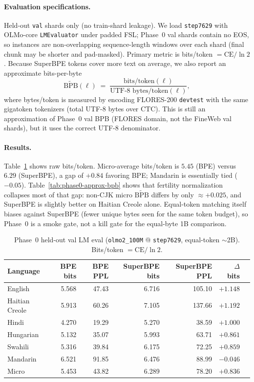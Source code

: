 \documentclass[11pt,a4paper]{article}
\newcommand{\CTC}{\mathrm{CTC}}
\begin{document}
\paragraph{Evaluation specifications.}
Held-out \texttt{val} shards only (no train-shard leakage).
We load \texttt{step7629} with OLMo-core \texttt{LMEvaluator} under padded FSL; Phase~0 val shards contain no EOS, so instances are non-overlapping sequence-length windows over each shard (final chunk may be shorter and pad-masked).
Primary metric is bits/token $=\mathrm{CE}/\ln 2$.
Because SuperBPE tokens cover more text on average, we also report an approximate bits-per-byte
\begin{equation}
  \widetilde{\mathrm{BPB}}(\ell)
  \;=\;
  \frac{\text{bits/token}(\ell)}{\text{UTF-8 bytes/token}(\ell)},
\end{equation}
where bytes/token is measured by encoding FLORES-200 \texttt{devtest} with the same gigatoken tokenizers (total UTF-8 bytes over $\CTC$).
This is still an approximation of Phase~0 val BPB (FLORES domain, not the FineWeb val shards), but it uses the correct UTF-8 denominator.

\paragraph{Results.}
Table~\ref{tab:phase0-bits} shows raw bits/token.
Micro-average bits/token is $5.45$ (BPE) versus $6.29$ (SuperBPE), a gap of $+0.84$ favoring BPE; Mandarin is essentially tied ($-0.05$).
Table~\ref{tab:phase0-approx-bpb} shows that fertility normalization collapses most of that gap: non-CJK micro $\widetilde{\mathrm{BPB}}$ differs by only $\approx{+}0.025$, and SuperBPE is slightly better on Haitian Creole alone.
Equal-token matching itself biases against SuperBPE (fewer unique bytes seen for the same token budget), so Phase~0 is a smoke gate, not a kill gate for the equal-byte 1B comparison.

\begin{table}[t]
\centering
\caption{Phase~0 held-out val LM eval (\texttt{olmo2\_100M} @ \texttt{step7629}, equal-token $\sim$2B). Bits/token $=\mathrm{CE}/\ln 2$.}
\label{tab:phase0-bits}
\small
\begin{tabular}{@{}lrrrrrr@{}}
\toprule
Language & BPE bits & BPE PPL & SuperBPE bits & SuperBPE PPL & $\Delta$ bits \\
\midrule
English        & 5.568 & 47.43 & 6.716 & 105.10 & $+1.148$ \\
Haitian Creole & 5.913 & 60.26 & 7.105 & 137.66 & $+1.192$ \\
Hindi          & 4.270 & 19.29 & 5.270 &  38.59 & $+1.000$ \\
Hungarian      & 5.132 & 35.07 & 5.993 &  63.71 & $+0.861$ \\
Swahili        & 5.316 & 39.84 & 6.175 &  72.25 & $+0.859$ \\
Mandarin       & 6.521 & 91.85 & 6.476 &  88.99 & $-0.046$ \\
\midrule
Micro          & 5.453 & 43.82 & 6.289 &  78.20 & $+0.836$ \\
\bottomrule
\end{tabular}
\end{table}
\end{document}

